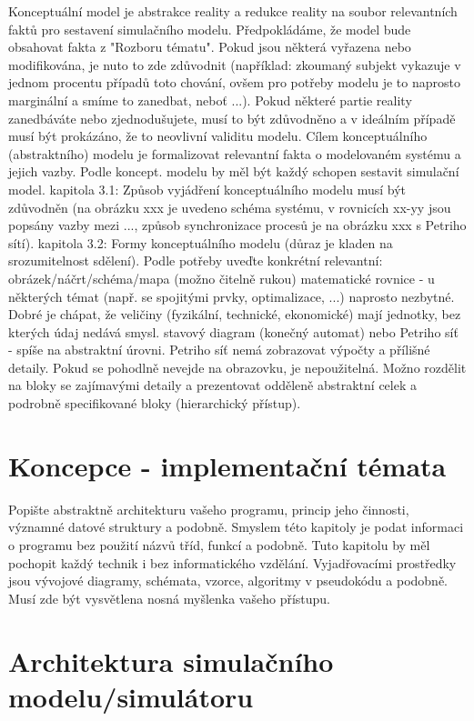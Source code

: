 \documentclass[a4paper,11pt]{article}
\begin{document}
Konceptuální model je abstrakce reality a redukce reality na soubor relevantních faktů pro sestavení simulačního modelu. Předpokládáme, že model bude obsahovat fakta z "Rozboru tématu". Pokud jsou některá vyřazena nebo modifikována, je nuto to zde zdůvodnit (například: zkoumaný subjekt vykazuje v jednom procentu případů toto chování, ovšem pro potřeby modelu je to naprosto marginální a smíme to zanedbat, neboť ...). Pokud některé partie reality zanedbáváte nebo zjednodušujete, musí to být zdůvodněno a v ideálním případě musí být prokázáno, že to neovlivní validitu modelu. Cílem konceptuálního (abstraktního) modelu je formalizovat relevantní fakta o modelovaném systému a jejich vazby. Podle koncept. modelu by měl být každý schopen sestavit simulační model.
kapitola 3.1: Způsob vyjádření konceptuálního modelu musí být zdůvodněn (na obrázku xxx je uvedeno schéma systému, v rovnicích xx-yy jsou popsány vazby mezi ..., způsob synchronizace procesů je na obrázku xxx s Petriho sítí).
kapitola 3.2: Formy konceptuálního modelu (důraz je kladen na srozumitelnost sdělení). Podle potřeby uveďte konkrétní relevantní:
obrázek/náčrt/schéma/mapa (možno čitelně rukou)
matematické rovnice - u některých témat (např. se spojitými prvky, optimalizace, ...) naprosto nezbytné. Dobré je chápat, že veličiny (fyzikální, technické, ekonomické) mají jednotky, bez kterých údaj nedává smysl.
stavový diagram (konečný automat) nebo Petriho síť - spíše na abstraktní úrovni. Petriho síť nemá zobrazovat výpočty a přílišné detaily. Pokud se pohodlně nevejde na obrazovku, je nepoužitelná. Možno rozdělit na bloky se zajímavými detaily a prezentovat odděleně abstraktní celek a podrobně specifikované bloky (hierarchický přístup).

\section{Koncepce - implementační témata}

Popište abstraktně architekturu vašeho programu, princip jeho činnosti, významné datové struktury a podobně. Smyslem této kapitoly je podat informaci o programu bez použití názvů tříd, funkcí a podobně. Tuto kapitolu by měl pochopit každý technik i bez informatického vzdělání. Vyjadřovacími prostředky jsou vývojové diagramy, schémata, vzorce, algoritmy v pseudokódu a podobně. Musí zde být vysvětlena nosná myšlenka vašeho přístupu.


\section{Architektura simulačního modelu/simulátoru}
\end{document}
